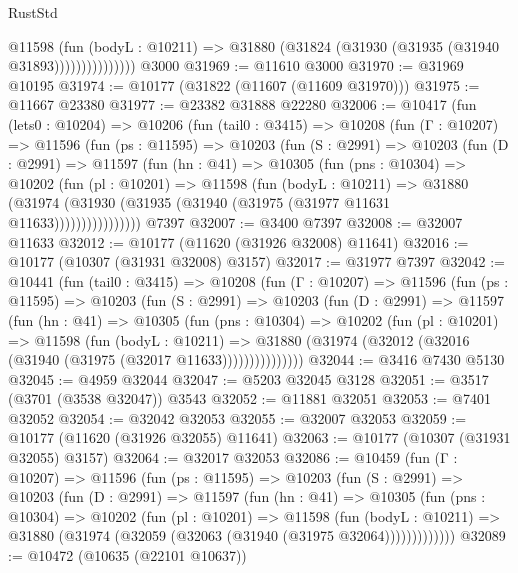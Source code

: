 \begin{lexlean}{RustStd}
\begin{coremodule}
                      @11598
                        (fun (bodyL : @10211) =>
                        @31880 (@31824 (@31930 (@31935 (@31940 @31893)))))))))))))))
    @3000
@31969 := @11610 @3000
@31970 := @31969 @10195
@31974 := @10177 (@31822 (@11607 (@11609 @31970)))
@31975 := @11667 @23380
@31977 := @23382 @31888 @22280
@32006 := @10417
    (fun (lets0 : @10204) =>
    @10206
      (fun (tail0 : @3415) =>
      @10208
        (fun (Γ : @10207) =>
        @11596
          (fun (ps : @11595) =>
          @10203
            (fun (S : @2991) =>
            @10203
              (fun (D : @2991) =>
              @11597
                (fun (hn : @41) =>
                @10305
                  (fun (pns : @10304) =>
                  @10202
                    (fun (pl : @10201) =>
                    @11598
                      (fun (bodyL : @10211) =>
                      @31880
                        (@31974
                          (@31930 (@31935 (@31940 (@31975 (@31977 @11631 @11633))))))))))))))))
    @7397
@32007 := @3400 @7397
@32008 := @32007 @11633
@32012 := @10177 (@11620 (@31926 @32008) @11641)
@32016 := @10177 (@10307 (@31931 @32008) @3157)
@32017 := @31977 @7397
@32042 := @10441
    (fun (tail0 : @3415) =>
    @10208
      (fun (Γ : @10207) =>
      @11596
        (fun (ps : @11595) =>
        @10203
          (fun (S : @2991) =>
          @10203
            (fun (D : @2991) =>
            @11597
              (fun (hn : @41) =>
              @10305
                (fun (pns : @10304) =>
                @10202
                  (fun (pl : @10201) =>
                  @11598
                    (fun (bodyL : @10211) =>
                    @31880 (@31974 (@32012 (@32016 (@31940 (@31975 (@32017 @11633)))))))))))))))
@32044 := @3416 @7430 @5130
@32045 := @4959 @32044
@32047 := @5203 @32045 @3128
@32051 := @3517 (@3701 (@3538 @32047)) @3543
@32052 := @11881 @32051
@32053 := @7401 @32052
@32054 := @32042 @32053
@32055 := @32007 @32053
@32059 := @10177 (@11620 (@31926 @32055) @11641)
@32063 := @10177 (@10307 (@31931 @32055) @3157)
@32064 := @32017 @32053
@32086 := @10459
    (fun (Γ : @10207) =>
    @11596
      (fun (ps : @11595) =>
      @10203
        (fun (S : @2991) =>
        @10203
          (fun (D : @2991) =>
          @11597
            (fun (hn : @41) =>
            @10305
              (fun (pns : @10304) =>
              @10202
                (fun (pl : @10201) =>
                @11598
                  (fun (bodyL : @10211) =>
                  @31880 (@31974 (@32059 (@32063 (@31940 (@31975 @32064)))))))))))))
@32089 := @10472 (@10635 (@22101 @10637))

\end{coremodule}
\end{lexlean}
